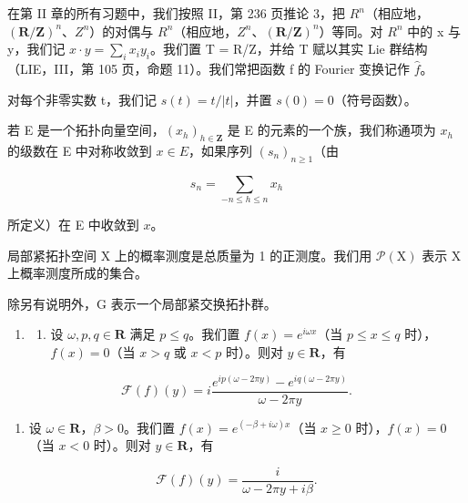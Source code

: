
在第 II 章的所有习题中，我们按照 II，第 236 页推论 3，把 \(R^{n}\)（相应地，\((\mathbf{R}/\mathbf{Z})^{n}\)、\(Z^{n}\)）的对偶与 \(R^{n}\)（相应地，\(Z^{n}\)、\((\mathbf{R}/\mathbf{Z})^{n}\)）等同。对 \(R^{n}\) 中的 x 与 y，我们记 \(x \cdot y = \sum_{i} x_{i} y_{i}\)。我们置 T = R/Z，并给 T 赋以其实 Lie 群结构（LIE，III，第 105 页，命题 11）。我们常把函数 f 的 Fourier 变换记作 \(\widehat{f}\)。

对每个非零实数 t，我们记 \(s(t) = t/|t|\)，并置 \(s(0) = 0\)（符号函数）。

若 E 是一个拓扑向量空间，\((x_{h})_{h\in\mathbf{Z}}\) 是 E 的元素的一个族，我们称通项为 \(x_{h}\) 的级数在 E 中对称收敛到 \(x\in E\)，如果序列 \((s_{n})_{n\geqslant1}\)（由

\[
s _ {n} = \sum_ {- n \leqslant h \leqslant n} x _ {h}
\]

所定义）在 E 中收敛到 \(x\)。

局部紧拓扑空间 X 上的概率测度是总质量为 1 的正测度。我们用 \(\mathcal{P}(\mathrm{X})\) 表示 X 上概率测度所成的集合。

除另有说明外，G 表示一个局部紧交换拓扑群。
\relax{}

\begin{enumerate}
\def\labelenumi{\arabic{enumi})}
\tightlist
\item
  \begin{enumerate}
  \def\labelenumii{\alph{enumii})}
  \tightlist
  \item
    设 \(\omega, p, q \in \mathbf{R}\) 满足 \(p \leqslant q\)。我们置 \(f(x) = e^{i\omega x}\)（当 \(p \leqslant x \leqslant q\) 时），\(f(x) = 0\)（当 \(x > q\) 或 \(x < p\) 时）。则对 \(y \in \mathbf{R}\)，有
  \end{enumerate}
\end{enumerate}

\[
\mathcal {F} (f) (y) = i \frac {e ^ {i p (\omega - 2 \pi y)} - e ^ {i q (\omega - 2 \pi y)}}{\omega - 2 \pi y}.
\]

\begin{enumerate}
\def\labelenumi{\alph{enumi})}
\setcounter{enumi}{1}
\tightlist
\item
    设 \(\omega \in \mathbf{R}\)，\(\beta > 0\)。我们置 \(f(x) = e^{(-\beta + i\omega)x}\)（当 \(x \geqslant 0\) 时），\(f(x) = 0\)（当 \(x < 0\) 时）。则对 \(y \in \mathbf{R}\)，有
\end{enumerate}

\[
\mathcal {F} (f) (y) = \frac {i}{\omega - 2 \pi y + i \beta}.
\]

